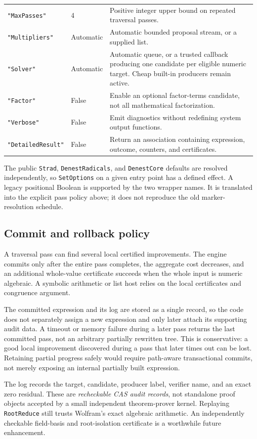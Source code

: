 \documentclass[11pt,letterpaper]{article}
\newcommand{\code}[1]{\texttt{#1}}
\theoremstyle{definition}
\begin{document}
\begin{longtable}{@{}p{}p{}p{}@{}}
\code{"MaxPasses"} & 4 & Positive integer upper bound on repeated traversal passes.\\
\code{"Multipliers"} & Automatic & Automatic bounded proposal stream, or a supplied list.\\
\code{"Solver"} & Automatic & Automatic queue, or a trusted callback producing one candidate per eligible numeric target. Cheap built-in producers remain active.\\
\code{"Factor"} & False & Enable an optional factor-terms candidate, not all mathematical factorization.\\
\code{"Verbose"} & False & Emit diagnostics without redefining system output functions.\\
\code{"DetailedResult"} & False & Return an association containing expression, outcome, counters, and certificates.\\
\end{longtable}

The public \code{Strad}, \code{DenestRadicals}, and \code{DenestCore} defaults are resolved independently, so \code{SetOptions} on a given entry point has a defined effect. A legacy positional Boolean is supported by the two wrapper names. It is translated into the explicit pass policy above; it does not reproduce the old marker-resolution schedule.

\subsection{Commit and rollback policy}

A traversal pass can find several local certified improvements. The engine commits only after the entire pass completes, the aggregate cost decreases, and an additional whole-value certificate succeeds when the whole input is numeric algebraic. A symbolic arithmetic or list host relies on the local certificates and congruence argument.

The committed expression and its log are stored as a single record, so the code does not separately assign a new expression and only later attach its supporting audit data. A timeout or memory failure during a later pass returns the last committed pass, not an arbitrary partially rewritten tree. This is conservative: a good local improvement discovered during a pass that later times out can be lost. Retaining partial progress safely would require path-aware transactional commits, not merely exposing an internal partially built expression.

The log records the target, candidate, producer label, verifier name, and an exact zero residual. These are \emph{recheckable CAS audit records}, not standalone proof objects accepted by a small independent theorem-prover kernel. Replaying \code{RootReduce} still trusts Wolfram's exact algebraic arithmetic. An independently checkable field-basis and root-isolation certificate is a worthwhile future enhancement.
\end{document}
